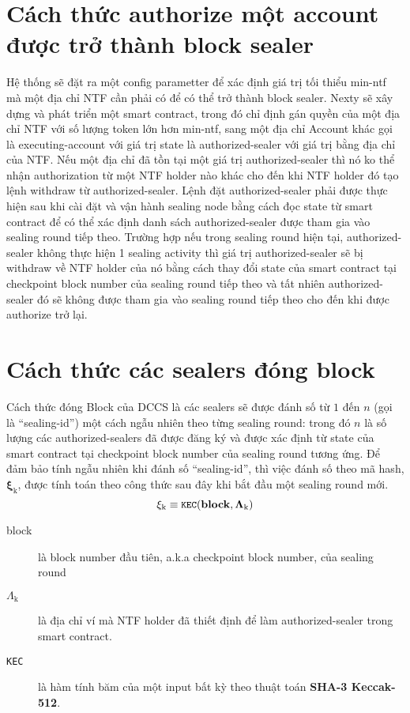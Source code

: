 \documentclass[12pt]{amsart}
\begin{document}
\begin{multicols}{2}
\section{Cách thức authorize một account được trở thành block sealer}
Hệ thống sẽ đặt ra một config parametter để xác định giá trị tối thiểu min-ntf mà một địa chỉ NTF cần phải có để có thể trở thành block sealer.
Nexty sẽ xây dựng và phát triển một smart contract, trong đó chỉ định gán quyền của một địa chỉ NTF với số lượng token lớn hơn min-ntf, sang một địa chỉ Account khác gọi là executing-account với giá trị state là authorized-sealer với giá trị bằng địa chỉ của NTF. Nếu một địa chỉ đã tồn tại một giá trị authorized-sealer thì nó ko thể nhận authorization từ một NTF holder nào khác cho đến khi NTF holder đó tạo lệnh withdraw từ authorized-sealer. Lệnh đặt authorized-sealer phải được thực hiện sau khi cài đặt và vận hành sealing node bằng cách đọc state từ smart contract để có thể xác định danh sách authorized-sealer được tham gia vào sealing round tiếp theo. Trường hợp nếu trong sealing round hiện tại, authorized-sealer không thực hiện 1 sealing activity thì giá trị authorized-sealer sẽ bị withdraw về NTF holder của nó bằng cách thay đổi state của smart contract tại checkpoint block number của sealing round tiếp theo và tất nhiên authorized-sealer đó sẽ không được tham gia vào sealing round tiếp theo cho đến khi được authorize trở lại.

\section{Cách thức các sealers đóng block}
Cách thức đóng Block của DCCS là các sealers sẽ được đánh số từ $1$ đến $n$ (gọi là ``sealing-id'') một cách ngẫu nhiên theo từng sealing round: trong đó $n$ là số lượng các authorized-sealers đã được đăng ký và được xác định từ state của smart contract tại checkpoint block number của sealing round tương ứng. Để đảm bảo tính ngẫu nhiên khi đánh số ``sealing-id'', thì việc đánh số theo mã hash, $\boldsymbol{\xi_{\mathrm{k}}}$, được tính toán theo công thức sau đây khi bắt đầu một sealing round mới. 
\begin{equation}
\xi_{\mathrm{k}} \equiv \texttt{\small KEC}(\mathbf{block}, \mathbf{\Lambda_{\mathrm{k}}})
\end{equation}

\begin{description}
\item[block] là block number đầu tiên, a.k.a checkpoint block number, của sealing round
\item[$\Lambda_{\mathrm{k}}$] là địa chỉ ví mà NTF holder đã thiết định để làm authorized-sealer trong smart contract.
\item[\texttt{\small KEC}] là hàm tính băm của một input bất kỳ theo thuật toán \textbf{SHA-3 Keccak-512}.
\end{description}


\end{multicols}
\end{document}
